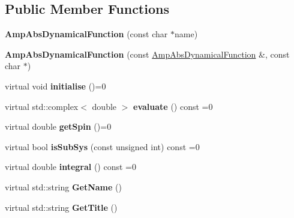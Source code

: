 \subsection*{Public Member Functions}
\begin{DoxyCompactItemize}
\item 
\hypertarget{class_amp_abs_dynamical_function_a28bc08161eec1480e2c52d91ec8c5be8}{{\bfseries Amp\-Abs\-Dynamical\-Function} (const char $\ast$name)}\label{class_amp_abs_dynamical_function_a28bc08161eec1480e2c52d91ec8c5be8}

\item 
\hypertarget{class_amp_abs_dynamical_function_a13ca78b1eaa2998c3db8c3eca8c93bac}{{\bfseries Amp\-Abs\-Dynamical\-Function} (const \hyperlink{class_amp_abs_dynamical_function}{Amp\-Abs\-Dynamical\-Function} \&, const char $\ast$)}\label{class_amp_abs_dynamical_function_a13ca78b1eaa2998c3db8c3eca8c93bac}

\item 
\hypertarget{class_amp_abs_dynamical_function_a7ba5980ea098ed83d96a9c6464c8bb6a}{virtual void {\bfseries initialise} ()=0}\label{class_amp_abs_dynamical_function_a7ba5980ea098ed83d96a9c6464c8bb6a}

\item 
\hypertarget{class_amp_abs_dynamical_function_a1fafdad84744aa1469e4696030598084}{virtual std\-::complex$<$ double $>$ {\bfseries evaluate} () const =0}\label{class_amp_abs_dynamical_function_a1fafdad84744aa1469e4696030598084}

\item 
\hypertarget{class_amp_abs_dynamical_function_a89b4fafcd8421366b5f923fd0e12de30}{virtual double {\bfseries get\-Spin} ()=0}\label{class_amp_abs_dynamical_function_a89b4fafcd8421366b5f923fd0e12de30}

\item 
\hypertarget{class_amp_abs_dynamical_function_a6bf35600e519ab9e257b978275dd4297}{virtual bool {\bfseries is\-Sub\-Sys} (const unsigned int) const =0}\label{class_amp_abs_dynamical_function_a6bf35600e519ab9e257b978275dd4297}

\item 
\hypertarget{class_amp_abs_dynamical_function_a3b9b4feba0885d42fd823d2a84f41b81}{virtual double {\bfseries integral} () const =0}\label{class_amp_abs_dynamical_function_a3b9b4feba0885d42fd823d2a84f41b81}

\item 
\hypertarget{class_amp_abs_dynamical_function_a9ec34f0d8d6d0526d171358fb267a7fd}{virtual std\-::string {\bfseries Get\-Name} ()}\label{class_amp_abs_dynamical_function_a9ec34f0d8d6d0526d171358fb267a7fd}

\item 
\hypertarget{class_amp_abs_dynamical_function_ac181b0715993d90867b78b392c2e0be9}{virtual std\-::string {\bfseries Get\-Title} ()}\label{class_amp_abs_dynamical_function_ac181b0715993d90867b78b392c2e0be9}

\end{DoxyCompactItemize}
